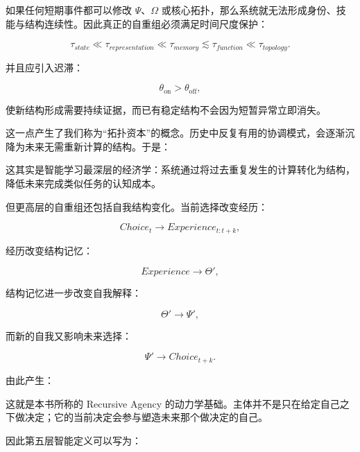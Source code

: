 \begin{statementbox}
\centering
{}
\end{statementbox}

如果任何短期事件都可以修改 \(\Psi\)、\(\Omega\) 或核心拓扑，那么系统就无法形成身份、技能与结构连续性。因此真正的自重组必须满足时间尺度保护：

\[
\tau_{state}
\ll
\tau_{representation}
\ll
\tau_{memory}
\lesssim
\tau_{function}
\ll
\tau_{topology}.
\]

并且应引入迟滞：

\[
\theta_{\mathrm{on}}
>
\theta_{\mathrm{off}},
\]

使新结构形成需要持续证据，而已有稳定结构不会因为短暂异常立即消失。

这一点产生了我们称为“拓扑资本”的概念。历史中反复有用的协调模式，会逐渐沉降为未来无需重新计算的结构。于是：

\begin{statementbox}
\centering
{}
\end{statementbox}

这其实是智能学习最深层的经济学：系统通过将过去重复发生的计算转化为结构，降低未来完成类似任务的认知成本。

但更高层的自重组还包括自我结构变化。当前选择改变经历：

\[
Choice_t
\rightarrow
Experience_{t:t+k},
\]

经历改变结构记忆：

\[
Experience
\rightarrow
\Theta',
\]

结构记忆进一步改变自我解释：

\[
\Theta'
\rightarrow
\Psi',
\]

而新的自我又影响未来选择：

\[
\Psi'
\rightarrow
Choice_{t+k}.
\]

由此产生：

\begin{statementbox}
\centering
{}
\end{statementbox}

这就是本书所称的 Recursive Agency 的动力学基础。主体并不是只在给定自己之下做决定；它的当前决定会参与塑造未来那个做决定的自己。

因此第五层智能定义可以写为：

